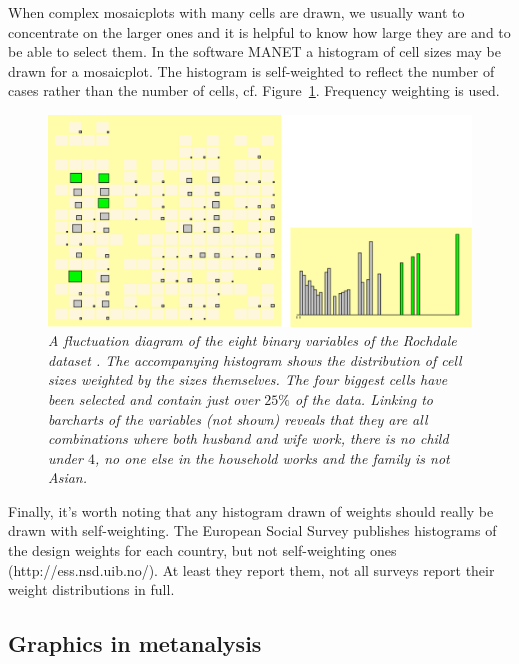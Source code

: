 \documentclass{svmult}
\begin{document}
When complex mosaicplots with many cells are drawn, we usually want to concentrate on the larger ones and it is helpful to know how large they are and to be able to select them.  In the software MANET \citep{unwin:1996} a histogram of cell sizes may be drawn for a mosaicplot.  The histogram is self-weighted to reflect the number of cases rather than the number of cells, cf. Figure~\ref{binmosaic}. Frequency weighting is used.


\begin{figure}[htbp]
  \centering
  \includegraphics[width=\linewidth]{binmosaic}
  \caption{\label{binmosaic}\em A fluctuation diagram of the eight binary variables of the Rochdale dataset \citep{whittaker:1990}.   The accompanying histogram shows the distribution of cell sizes weighted by the sizes themselves.  The four biggest cells have been selected and contain just over $25\%$ of the data.  Linking to barcharts of the variables (not shown) reveals that they are all combinations where both husband and wife work, there is no child under $4$, no one else in the household works and the family is not Asian.}
\end{figure}

Finally, it's worth noting that any histogram drawn of weights should really be drawn with self-weighting.  The European Social Survey publishes histograms of the design weights for each country, but not self-weighting ones (http://ess.nsd.uib.no/).  At least they report them, not all surveys report their weight distributions in full.
\newpage
\subsection{Graphics in metanalysis}
\label{meta}
\end{document}
